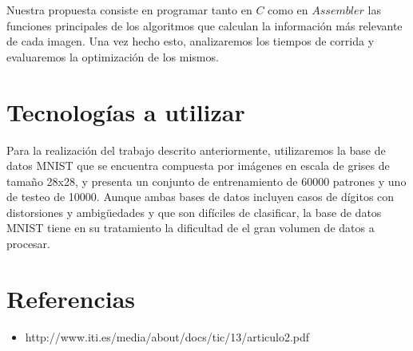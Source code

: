 \documentclass[10pt, a4paper]{article}
\begin{document}
Nuestra propuesta consiste en programar tanto en $C$ como en $Assembler$ las funciones principales de los algoritmos que calculan la información más relevante de cada imagen. Una vez hecho esto, analizaremos los tiempos de corrida y evaluaremos la optimización de los mismos.

\section{Tecnologías a utilizar}

Para la realización del trabajo descrito anteriormente, utilizaremos la base de datos MNIST que se encuentra compuesta por imágenes en escala de grises de tamaño 28x28, y presenta un conjunto de entrenamiento de 60000 patrones y uno de testeo de 10000. Aunque ambas bases de datos incluyen casos de dígitos con distorsiones y ambigüedades y que son difíciles de clasificar, la base de datos MNIST tiene en su tratamiento la dificultad de el gran volumen de datos a procesar.

\section{Referencias}
\begin{itemize}
\item http://www.iti.es/media/about/docs/tic/13/articulo2.pdf
\end{itemize}
\end{document}
